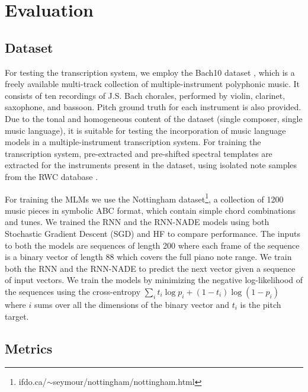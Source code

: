 \section{Evaluation} \label{sec:evaluation}

\subsection{Dataset}

For testing the transcription system, we employ the Bach10 dataset \cite{Duan2010}, which is a freely available multi-track collection of multiple-instrument polyphonic music. It consists of ten recordings of J.S. Bach chorales, performed by violin, clarinet, saxophone, and bassoon. Pitch ground truth for each instrument is also provided. Due to the tonal and homogeneous content of the dataset (single composer, single music language), it is suitable for testing the incorporation of music language models in a multiple-instrument transcription system. For training the transcription system, pre-extracted and pre-shifted spectral templates are extracted for the instruments present in the dataset, using isolated note samples from the RWC database \cite{Goto2003}. 

For training the MLMs we use the Nottingham dataset\footnote{ifdo.ca/$\sim$seymour/nottingham/nottingham.html}, a collection of 1200 music pieces in symbolic ABC format, which contain simple chord combinations and tunes. We trained the RNN and the RNN-NADE models using both Stochastic Gradient Descent (SGD) and HF to compare performance. The inputs to both the models are sequences of length 200 where each frame of the sequence is a binary vector of length 88 which covers the full piano note range. We train both the RNN and the RNN-NADE to predict the next vector given a sequence of input vectors. We train the models by minimizing the negative log-likelihood of the sequences using the cross-entropy $ \sum_{i}t_{i}\log p_{i} + (1 - t_{i})\log(1-p_{i})$ where $i$ sums over all the dimensions of the binary vector and $t_i$ is the pitch target.


\subsection{Metrics}


